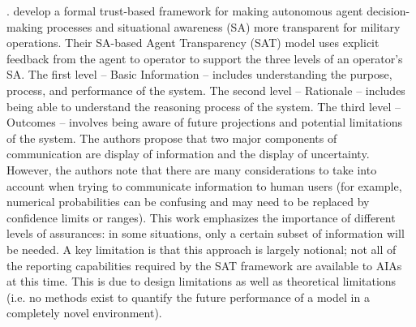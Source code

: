 .
\citet{Chen2014-dk} develop a formal trust-based framework for making autonomous agent decision-making processes and situational awareness (SA) \cite{Endsley1995-ie} more transparent for military operations. Their SA-based Agent Transparency (SAT) model uses explicit feedback from the agent to operator to support the three levels of an operator's SA. 
The first level -- Basic Information -- includes understanding the purpose, process, and performance of the system. 
The second level -- Rationale -- includes being able to understand the reasoning process of the system. 
The third level -- Outcomes -- involves being aware of future projections and potential limitations of the system. 
The authors propose that two major components of communication are display of information and the display of uncertainty. 
However, the authors note that there are many considerations to take into account when trying to communicate information to human users (for example, numerical probabilities can be confusing and may need to be replaced by confidence limits or ranges). 
This work emphasizes the importance of different levels of assurances: in some situations, only a certain subset of information will be needed. 
A key limitation is that this approach is largely notional; not all of the reporting capabilities required by the SAT framework are available to AIAs at this time. 
This is due to design limitations as well as theoretical limitations (i.e. no methods exist to quantify the future performance of a model in a completely novel environment). 

